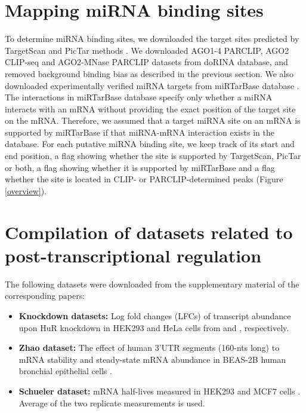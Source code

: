 \clearpage

\section{Mapping miRNA binding sites}
To determine miRNA binding sites, we downloaded the target sites predicted by TargetScan and PicTar methods \cite{targetscan_05, pictar_05}. We downloaded AGO1-4 PARCLIP, AGO2 CLIP-seq and AGO2-MNase PARCLIP datasets from doRINA database, and removed background binding bias as described in the previous section. We also downloaded experimentally verified miRNA targets from miRTarBase database \cite{mirtarbase}. The interactions in miRTarBase database specify only whether a miRNA interacts with an mRNA without providing the exact position of the target site on the mRNA. Therefore, we assumed that a target miRNA site on an mRNA is supported by miRTarBase if that miRNA-mRNA interaction exists in the database. For each putative miRNA binding site, we keep track of its start and end position, a flag showing whether the site is supported by TargetScan, PicTar or both, a flag showing whether it is supported by miRTarBase and a flag whether the site is located in CLIP- or PARCLIP-determined peaks (Figure \ref{overview}).

\section{Compilation of datasets related to post-transcriptional regulation}

The following datasets were downloaded from the supplementary material of the corresponding papers:
\begin{itemize}
\item \textbf{Knockdown datasets:} Log fold changes (LFCs) of transcript abundance upon HuR knockdown in  HEK293 and HeLa cells from \cite{mukharjee_11} and \cite{lebedeva_11}, respectively. 
\item \textbf{Zhao dataset:} The effect of human 3'UTR segments (160-nts long) to mRNA stability and steady-state mRNA abundance in BEAS-2B human bronchial epithelial cells \cite{zhao_14}.
\item \textbf{Schueler dataset:} mRNA half-lives measured in HEK293 and MCF7 cells \cite{schueler_14}. Average of the two replicate measurements is used. 
\end{itemize}

